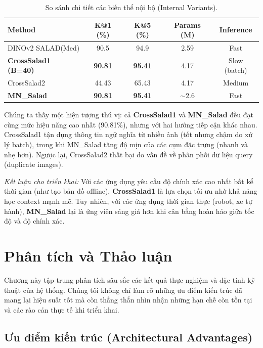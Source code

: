 \documentclass[12pt,a4paper]{article}
\begin{document}
    \begin{table}[h]
    \centering
    \caption{So sánh chi tiết các biến thể nội bộ (Internal Variants).}
    \label{tab:overall_comparison}
    \begin{tabular}{@{}lcccc@{}}
    \toprule
    \textbf{Method} & \textbf{K@1 (\%)} & \textbf{K@5 (\%)} & \textbf{Params (M)} & \textbf{Inference} \\
    \midrule
    DINOv2 SALAD(Med) & 90.5 & 94.9 & 2.59 & Fast \\
    \textbf{CrossSalad1 (B=40)} & \textbf{90.81} & \textbf{95.41} & 4.17 & Slow (batch) \\
    CrossSalad2 & 44.43 & 65.43 & 4.17 & Medium \\
    \textbf{MN\_Salad} & \textbf{90.81} & \textbf{95.41} & $\sim$2.6 & Fast \\
    \bottomrule
    \end{tabular}
    \end{table}

    Chúng ta thấy một hiện tượng thú vị: cả \textbf{CrossSalad1} và \textbf{MN\_Salad} đều đạt cùng mức hiệu năng cao nhất (90.81\%), nhưng với hai hướng tiếp cận khác nhau. CrossSalad1 tận dụng thông tin ngữ nghĩa từ nhiều ảnh (tốt nhưng chậm do xử lý batch), trong khi MN\_Salad tăng độ mịn của các cụm đặc trưng (nhanh và nhẹ hơn). Ngược lại, CrossSalad2 thất bại do vấn đề về phân phối dữ liệu query (duplicate images).
    
    \textit{Kết luận cho triển khai:} Với các ứng dụng yêu cầu độ chính xác cao nhất bất kể thời gian (như tạo bản đồ offline), \textbf{CrossSalad1} là lựa chọn tối ưu nhờ khả năng học context mạnh mẽ. Tuy nhiên, với các ứng dụng thời gian thực (robot, xe tự hành), \textbf{MN\_Salad} lại là ứng viên sáng giá hơn khi cân bằng hoàn hảo giữa tốc độ và độ chính xác.

    \section{Phân tích và Thảo luận}

    Chương này tập trung phân tích sâu sắc các kết quả thực nghiệm và đặc tính kỹ thuật của hệ thống. Chúng tôi không chỉ làm rõ những ưu điểm kiến trúc đã mang lại hiệu suất tốt mà còn thẳng thắn nhìn nhận những hạn chế còn tồn tại và các rào cản thực tế khi triển khai.

    \subsection{Ưu điểm kiến trúc (Architectural Advantages)}
\end{document}
